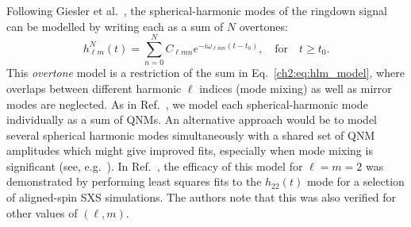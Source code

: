 
Following Giesler et al.~\cite{Giesler:2019uxc}, the spherical-harmonic modes of the ringdown signal can be modelled by writing each as a sum of $N$ overtones:
\begin{equation}\label{GieslerRD}
    h_{\ell m}^N(t) = \sum_{n=0}^N C_{\ell m n} e^{-i\omega_{\ell m n}(t-t_0)}, \quad \textrm{for} \quad t \geq t_0.
\end{equation}
This \emph{overtone} model is a restriction of the sum in Eq.~\ref{ch2:eq:hlm_model}, where overlaps between different harmonic $\ell$ indices (mode mixing) \cite{Berti:2014fga} as well as mirror modes are neglected. 
As in Ref.~\cite{Giesler:2019uxc}, we model each spherical-harmonic mode individually as a sum of QNMs. An alternative approach would be to model several spherical harmonic modes simultaneously with a shared set of QNM amplitudes which might give improved fits, especially when mode mixing is significant (see, e.g.\ \cite{Cook:2020otn}).
In Ref.~\cite{Giesler:2019uxc}, the efficacy of this model for $\ell=m=2$ was demonstrated by performing least squares fits to the $h_{22}(t)$ mode for a selection of aligned-spin SXS simulations. The authors note that this was also verified for other values of $(\ell,m)$.

